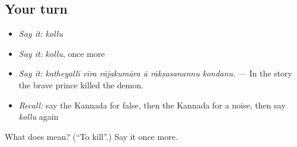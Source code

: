\subsection*{Your turn}
\begin{itemize}
\raggedright
  \item \emph{Say it:} \emph{kollu}
  \item \emph{Say it:} \emph{kollu}, once more
  \item \emph{Say it:} \emph{katheyalli vīra rājakumāra ā rākṣasanannu kondanu.} — In the story the brave prince killed the demon.
  \item \emph{Recall:} say the Kannada for false, then the Kannada for a noise, then say \emph{kollu} again
\end{itemize}

\begin{tcolorbox}[breakable,colback=teal!4,colframe=teal!35!black,title={Before you move on}]
What does  mean? (\textquotedblleft{}To kill\textquotedblright{}.) Say it once more.
\end{tcolorbox}
